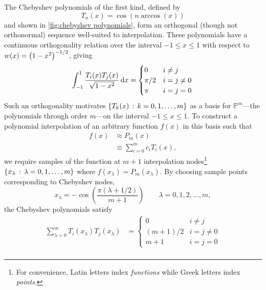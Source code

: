 The Chebyshev polynomials of the first kind, defined by
\begin{equation}
  T_n(x) = \cos(n \arccos(x))
  \label{eq:chebyshev}
\end{equation}
and shown in \cref{fig:chebyshev polynomials}, form an orthogonal (though not orthonormal) sequence well-suited to interpolation.
These polynomials have a continuous orthogonality relation over the interval $-1 \leqslant x \leqslant 1$ with respect to $w(x) = \qty(1-x^2)^{-1/2}$, giving
\begin{equation}
  \int_{-1}^1 \frac{T_i(x) T_j(x)}{\sqrt{1 - x^2}} \dd{x} =
  \begin{cases}
    0 & i \not = j \\
    \pi / 2 & i = j \not = 0 \\
    \pi & i = j = 0
  \end{cases} \label{eq:continuous orthogonality} \\
\end{equation}
Such an orthogonality motivates $\qty{T_k(x)\, : \, k = 0, 1, \ldots, m}$ as a basis for $\mathbb{P}^m$---the polynomials through order $m$---on the interval $-1 \leqslant x \leqslant 1$.
To construct a polynomial interpolation of an arbitrary function $f(x)$ in this basis such that
\begin{equation}
  \begin{aligned}
    f(x) &\approx P_m(x) \\
    &\equiv \sum_{i = 0}^{m} c_i T_i(x),
  \end{aligned}
  \label{eq:chebyshev expansion}
\end{equation}
we require samples of the function at $m+1$ interpolation nodes\footnote{For convenience, Latin letters index \emph{functions} while Greek letters index \emph{points}.} $\qty{x_\lambda \,:\, \lambda = 0, 1, \ldots, m}$ where $f(x_\lambda) = P_m(x_\lambda)$.
By choosing sample points corresponding to Chebyshev nodes,
\begin{equation}
  x_\lambda = -\cos(\frac{\pi (\lambda + 1/2)}{m + 1}) \qquad \lambda = 0, 1, 2, \ldots, m,
\end{equation}
the Chebyshev polynomials satisfy~\cite{Gil2007}
\begin{equation}
  \begin{aligned}
    \sum_{\lambda = 0}^{m} T_i(x_\lambda) T_j(x_\lambda) &=
    \begin{cases}
      0 & i \not = j \\
      (m + 1)/2 & i = j \not = 0 \\
      m + 1 & i = j = 0
    \end{cases} \\
  \end{aligned}
  \label{eq:discrete orthogonality}
\end{equation}
